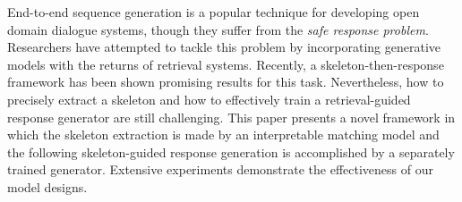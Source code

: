 End-to-end sequence generation is a popular technique for developing open domain dialogue systems, though they suffer from the \textit{safe response problem}. Researchers have attempted to tackle this problem by incorporating generative models with the returns of retrieval systems. Recently, a skeleton-then-response framework has been shown promising results for this task. Nevertheless, how to precisely extract a skeleton and how to effectively train a retrieval-guided response generator are still challenging. This paper presents a novel framework in which the skeleton extraction is made by an interpretable matching model and the following skeleton-guided response generation is accomplished by a separately trained generator. Extensive experiments demonstrate the effectiveness of our model designs.